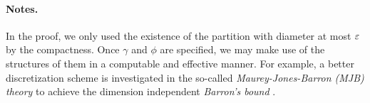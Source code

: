 \paragraph{Notes.}
In the proof, we only used the existence of the partition with diameter at most $\varepsilon$ by the compactness.
Once $\gamma$ and $\phi$ are specified, we may make use of the structures of them in a computable and effective manner.
For example, a better discretization scheme is investigated in the so-called \emph{Maurey-Jones-Barron (MJB) theory} to achieve the dimension independent \emph{Barron's bound} \citep[see, e.g.,][]{kainen.survey}.
